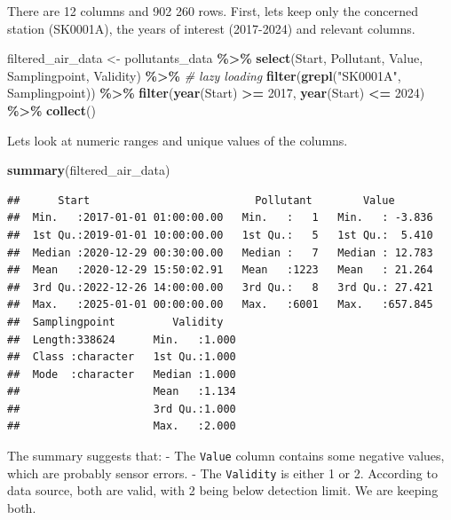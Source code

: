 \documentclass[
]{article}
\newenvironment{Shaded}{\begin{snugshade}}{\end{snugshade}}
\newcommand{\CommentTok}[1]{\textcolor[rgb]{0.56,0.35,0.01}{\textit{#1}}}
\newcommand{\DecValTok}[1]{\textcolor[rgb]{0.00,0.00,0.81}{#1}}
\newcommand{\FunctionTok}[1]{\textcolor[rgb]{0.13,0.29,0.53}{\textbf{#1}}}
\newcommand{\NormalTok}[1]{#1}
\newcommand{\OtherTok}[1]{\textcolor[rgb]{0.56,0.35,0.01}{#1}}
\newcommand{\SpecialCharTok}[1]{\textcolor[rgb]{0.81,0.36,0.00}{\textbf{#1}}}
\newcommand{\StringTok}[1]{\textcolor[rgb]{0.31,0.60,0.02}{#1}}
\begin{document}
There are 12 columns and 902 260 rows. First, lets keep only the
concerned station (SK0001A), the years of interest (2017-2024) and
relevant columns.

\begin{Shaded}
\begin{Highlighting}[]
\NormalTok{filtered\_air\_data }\OtherTok{\textless{}{-}}\NormalTok{ pollutants\_data }\SpecialCharTok{\%\textgreater{}\%}
  \FunctionTok{select}\NormalTok{(Start, Pollutant, Value, Samplingpoint, Validity) }\SpecialCharTok{\%\textgreater{}\%} \CommentTok{\# lazy loading}
  \FunctionTok{filter}\NormalTok{(}\FunctionTok{grepl}\NormalTok{(}\StringTok{"SK0001A"}\NormalTok{, Samplingpoint)) }\SpecialCharTok{\%\textgreater{}\%}
  \FunctionTok{filter}\NormalTok{(}\FunctionTok{year}\NormalTok{(Start) }\SpecialCharTok{\textgreater{}=} \DecValTok{2017}\NormalTok{, }\FunctionTok{year}\NormalTok{(Start) }\SpecialCharTok{\textless{}=} \DecValTok{2024}\NormalTok{) }\SpecialCharTok{\%\textgreater{}\%}
  \FunctionTok{collect}\NormalTok{() }
\end{Highlighting}
\end{Shaded}

Lets look at numeric ranges and unique values of the columns.

\begin{Shaded}
\begin{Highlighting}[]
\FunctionTok{summary}\NormalTok{(filtered\_air\_data)}
\end{Highlighting}
\end{Shaded}

\begin{verbatim}
##      Start                          Pollutant        Value        
##  Min.   :2017-01-01 01:00:00.00   Min.   :   1   Min.   : -3.836  
##  1st Qu.:2019-01-01 10:00:00.00   1st Qu.:   5   1st Qu.:  5.410  
##  Median :2020-12-29 00:30:00.00   Median :   7   Median : 12.783  
##  Mean   :2020-12-29 15:50:02.91   Mean   :1223   Mean   : 21.264  
##  3rd Qu.:2022-12-26 14:00:00.00   3rd Qu.:   8   3rd Qu.: 27.421  
##  Max.   :2025-01-01 00:00:00.00   Max.   :6001   Max.   :657.845  
##  Samplingpoint         Validity    
##  Length:338624      Min.   :1.000  
##  Class :character   1st Qu.:1.000  
##  Mode  :character   Median :1.000  
##                     Mean   :1.134  
##                     3rd Qu.:1.000  
##                     Max.   :2.000
\end{verbatim}

The summary suggests that: - The \texttt{Value} column contains some
negative values, which are probably sensor errors. - The
\texttt{Validity} is either 1 or 2. According to data source, both are
valid, with 2 being below detection limit. We are keeping both.
\end{document}
